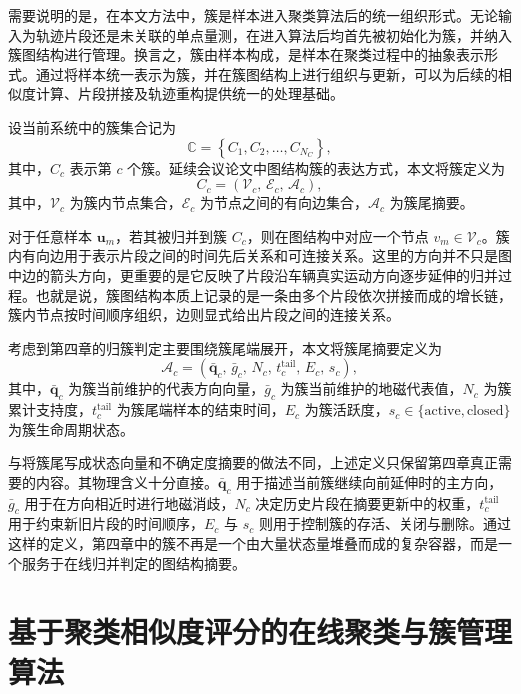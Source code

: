 \documentclass{xdupgthesis}
\begin{document}
需要说明的是，在本文方法中，簇是样本进入聚类算法后的统一组织形式。无论输入为轨迹片段还是未关联的单点量测，在进入算法后均首先被初始化为簇，并纳入簇图结构进行管理。换言之，簇由样本构成，是样本在聚类过程中的抽象表示形式。通过将样本统一表示为簇，并在簇图结构上进行组织与更新，可以为后续的相似度计算、片段拼接及轨迹重构提供统一的处理基础。

设当前系统中的簇集合记为
\begin{equation}
	\mathbb{C}=\left\{C_1,C_2,\ldots,C_{N_C}\right\},
\end{equation}
其中，$C_c$ 表示第 $c$ 个簇。延续会议论文中图结构簇的表达方式，本文将簇定义为
\begin{equation}
	C_c=
	\left(
	\mathcal{V}_c,\,
	\mathcal{E}_c,\,
	\mathcal{A}_c
	\right),
\end{equation}
其中，$\mathcal{V}_c$ 为簇内节点集合，$\mathcal{E}_c$ 为节点之间的有向边集合，$\mathcal{A}_c$ 为簇尾摘要。

对于任意样本 $\mathbf{u}_m$，若其被归并到簇 $C_c$，则在图结构中对应一个节点 $v_m\in\mathcal{V}_c$。簇内有向边用于表示片段之间的时间先后关系和可连接关系。这里的方向并不只是图中边的箭头方向，更重要的是它反映了片段沿车辆真实运动方向逐步延伸的归并过程。也就是说，簇图结构本质上记录的是一条由多个片段依次拼接而成的增长链，簇内节点按时间顺序组织，边则显式给出片段之间的连接关系。

考虑到第四章的归簇判定主要围绕簇尾端展开，本文将簇尾摘要定义为
\begin{equation}
	\mathcal{A}_c=
	\left(
	\bar{\mathbf{q}}_c,\,
	\bar{g}_c,\,
	N_c,\,
	t_c^{\mathrm{tail}},\,
	E_c,\,
	s_c
	\right),
\end{equation}
其中，$\bar{\mathbf{q}}_c$ 为簇当前维护的代表方向向量，$\bar{g}_c$ 为簇当前维护的地磁代表值，$N_c$ 为簇累计支持度，$t_c^{\mathrm{tail}}$ 为簇尾端样本的结束时间，$E_c$ 为簇活跃度，$s_c\in\{\mathrm{active},\mathrm{closed}\}$ 为簇生命周期状态。

与将簇尾写成状态向量和不确定度摘要的做法不同，上述定义只保留第四章真正需要的内容。其物理含义十分直接。$\bar{\mathbf{q}}_c$ 用于描述当前簇继续向前延伸时的主方向，$\bar{g}_c$ 用于在方向相近时进行地磁消歧，$N_c$ 决定历史片段在摘要更新中的权重，$t_c^{\mathrm{tail}}$ 用于约束新旧片段的时间顺序，$E_c$ 与 $s_c$ 则用于控制簇的存活、关闭与删除。通过这样的定义，第四章中的簇不再是一个由大量状态量堆叠而成的复杂容器，而是一个服务于在线归并判定的图结构摘要。

\section{基于聚类相似度评分的在线聚类与簇管理算法}
\end{document}
